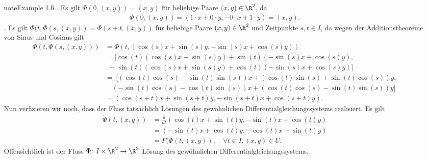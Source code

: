 \documentclass[letterpaper,10pt,english]{jupyterBook}
\begin{document}
\begin{sphinxadmonition}{note}{Example 1.6}
. Es gilt \(\Phi(0, (x,y)) = (x,y)\) für beliebige Paare \((x,y) \in \R^2\), da
\begin{equation*}
\begin{split}\Phi(0, (x,y)) = (1\cdot x + 0\cdot y, - 0 \cdot x + 1 \cdot y) = (x,y).\end{split}
\end{equation*}
. Es gilt \(\Phi(t, \Phi(s,(x,y)) = \Phi(s + t, (x,y))\) für beliebige Paare \((x,y) \in \R^2\) und Zeitpunkte \(s,t \in I\), da wegen der Additionstheoreme von Sinus und Cosinus gilt
\begin{equation*}
\begin{split}\Phi(t, \Phi(s,(x,y))) &= \Phi(t, (\cos(s)x + \sin(s)y, -\sin(s)x + \cos(s)y)) \\
&= [\cos(t)(\cos(s)x + \sin(s)y) + \sin(t)(-\sin(s)x + \cos(s)y), \\
& \ \ -\sin(t)(\cos(s)x + \sin(s)y) + \cos(t)(-\sin(s)x + \cos(s)y)]\\
&= \ [ (\cos(t)\cos(s) - \sin(t)\sin(s))x + (\cos(t)\sin(s) + \sin(t)\cos(s))y, \\
& \quad (-\sin(t)\cos(s) - \cos(t)\sin(s))x + (\cos(t)\cos(s) - \sin(t)\sin(s))y ] \\
&= (\cos(s+t)x + \sin(s+t)y, -\sin(s+t)x + \cos(s+t)y).\end{split}
\end{equation*}
\sphinxAtStartPar
Nun verfizieren wir noch, dass der Fluss tatsächlich Lösungen des gewöhnlichen Differentialgleichungssystems realisiert.
Es gilt
\begin{equation*}
\begin{split}\dot{\Phi}(t, (x,y)) &= \frac{d}{dt}(\cos(t)x + \sin(t)y, -\sin(t)x + \cos(t)y) 
\\&=
(-\sin(t)x + \cos(t)y, -\cos(t)x - \sin(t)y) 
\\&= 
F(\Phi(t,(x,y)), \quad \forall t \in I, (x,y) \in U.\end{split}
\end{equation*}
\sphinxAtStartPar
Offensichtlich ist der Fluss \(\Phi \colon I \times \R^2 \rightarrow \R^2\) Lösung des gewöhnlichen Differentialgleichungssystems.
\end{sphinxadmonition}
\end{document}
